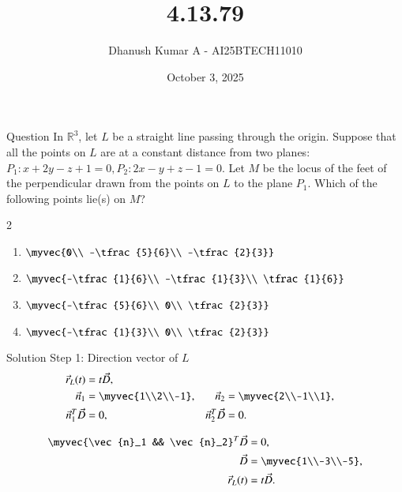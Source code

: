 \documentclass{beamer}
\title 
{4.13.79}
\date{October 3, 2025}
\author 
{Dhanush Kumar A - AI25BTECH11010}
\begin{document}
\frame{\titlepage}
\begin{frame}{Question}
In $\mathbb{R}^3$, let $L$ be a straight line passing through the origin. Suppose that all the points on $L$ are at a constant distance from two planes:$
P_1 : x+2y-z+1=0, 
P_2 : 2x-y+z-1=0.$
Let $M$ be the locus of the feet of the perpendicular drawn from the points on $L$ to the plane $P_1$. Which of the following points lie(s) on $M$?


		\begin{multicols}{2}
			\begin{enumerate}


\item $\myvec{0\\ -\tfrac{5}{6}\\ -\tfrac{2}{3}}$
\item $\myvec{-\tfrac{1}{6}\\ -\tfrac{1}{3}\\ \tfrac{1}{6}}$
\item $\myvec{-\tfrac{5}{6}\\ 0\\ \tfrac{2}{3}}$
\item $\myvec{-\tfrac{1}{3}\\ 0\\ \tfrac{2}{3}}$
	\end{enumerate}
\end{multicols}

\end{frame}
\begin{frame}{Solution}
Step 1: Direction vector of $L$
\begin{align}
\vec{r}_L(t) &= t \vec{D}, \\
\vec{n}_1 &= \myvec{1\\2\\-1}, & \vec{n}_2 &= \myvec{2\\-1\\1}, \\
\vec{n}_1^T \vec{D} &= 0, & \vec{n}_2^T \vec{D} &= 0.
\end{align}

\begin{align}
	\myvec{\vec{n}_1 && \vec{n}_2}^T \vec{D} &= 0, \\
\vec{D} &= \myvec{1\\-3\\-5}, \\
\vec{r}_L(t) &= t \vec{D}.
\end{align}
\end{frame}
\end{document}

